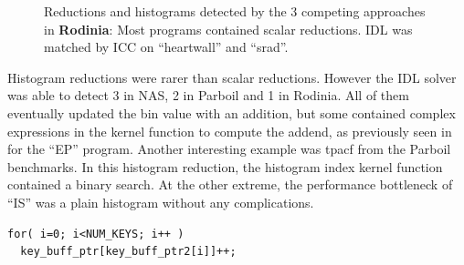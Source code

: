 \begin{figure}[p]
  \caption{Reductions and histograms detected by the 3 competing approaches
           in {\bf Rodinia}:
           Most programs contained scalar reductions.
           IDL was matched by ICC on ``heartwall'' and ``srad''.}
    \label{rodinia_spotted}
\end{figure}

    Histogram reductions were rarer than scalar reductions.
    However the IDL solver was able to detect 3 in NAS, 2 in Parboil and 1 in
    Rodinia.
    All of them eventually updated the bin value with an addition, but some
    contained complex expressions in the kernel function to compute the addend,
    as previously seen in  for the ``EP''
    program.
    Another interesting example was tpacf from the Parboil benchmarks.
    In this histogram reduction, the histogram index kernel function contained a
    binary search.
    At the other extreme, the performance bottleneck of ``IS'' was a plain
    histogram without any complications.
\begin{lstlisting}[language=MyCpp]
for( i=0; i<NUM_KEYS; i++ )
  key_buff_ptr[key_buff_ptr2[i]]++;
\end{lstlisting}


